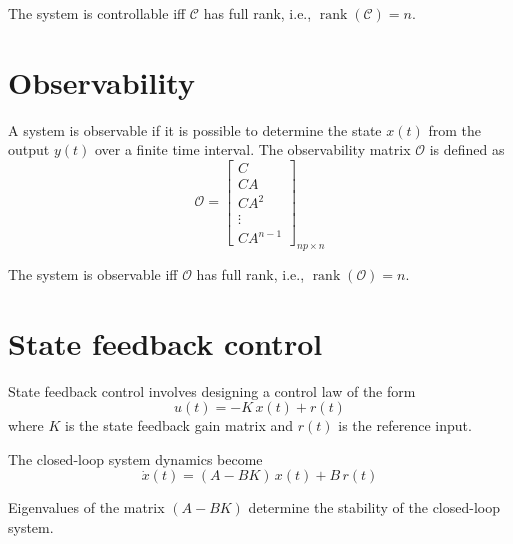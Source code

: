 The system is controllable iff \( \mathcal{C} \) has full rank, i.e., \( \operatorname{rank}(\mathcal{C}) = n \).

\section{Observability}

A system is observable if it is possible to determine the state \( x(t) \) from the output \( y(t) \) over a finite time interval.
The observability matrix \( \mathcal{O} \) is defined as
\begin{equation*}
    \mathcal{O}
    =
    \begin{bmatrix}
        C \\
        C A \\
        C A^2 \\
        \vdots \\
        C A^{n-1}
    \end{bmatrix}_{np \times n}
\end{equation*}

The system is observable iff \( \mathcal{O} \) has full rank, i.e., \( \operatorname{rank}(\mathcal{O}) = n \).

\section{State feedback control}

State feedback control involves designing a control law of the form
\begin{equation*}
    u(t)
    =
    -K \, x(t) + r(t)
\end{equation*}
where \( K \) is the state feedback gain matrix and \( r(t) \) is the reference input.

The closed-loop system dynamics become
\begin{equation*}
    \dot{x}(t)
    =
    (A - B K) \, x(t) + B \, r(t)
\end{equation*}

Eigenvalues of the matrix \( (A - B K) \) determine the stability of the closed-loop system.
